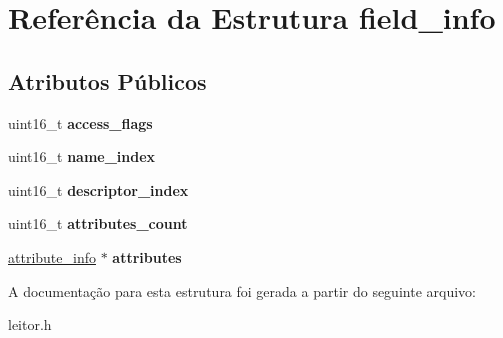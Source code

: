 \hypertarget{structfield__info}{\section{Referência da Estrutura field\-\_\-info}
\label{structfield__info}
}
\subsection*{Atributos Públicos}
\begin{DoxyCompactItemize}
\item 
\hypertarget{structfield__info_a97bcc8f6647cee71ea02bdd4183ba1da}{uint16\-\_\-t {\bfseries access\-\_\-flags}}\label{structfield__info_a97bcc8f6647cee71ea02bdd4183ba1da}

\item 
\hypertarget{structfield__info_a3041f6a85347269c5253f7d377384b06}{uint16\-\_\-t {\bfseries name\-\_\-index}}\label{structfield__info_a3041f6a85347269c5253f7d377384b06}

\item 
\hypertarget{structfield__info_a56345eae0135047540b60ca34c91eb46}{uint16\-\_\-t {\bfseries descriptor\-\_\-index}}\label{structfield__info_a56345eae0135047540b60ca34c91eb46}

\item 
\hypertarget{structfield__info_a26aebef0abc97afef9e9a34701e6b550}{uint16\-\_\-t {\bfseries attributes\-\_\-count}}\label{structfield__info_a26aebef0abc97afef9e9a34701e6b550}

\item 
\hypertarget{structfield__info_afdda114944ae5eaae78c237f99257108}{\hyperlink{structattribute__info}{attribute\-\_\-info} $\ast$ {\bfseries attributes}}\label{structfield__info_afdda114944ae5eaae78c237f99257108}

\end{DoxyCompactItemize}


A documentação para esta estrutura foi gerada a partir do seguinte arquivo\-:\begin{DoxyCompactItemize}
\item 
leitor.\-h\end{DoxyCompactItemize}
